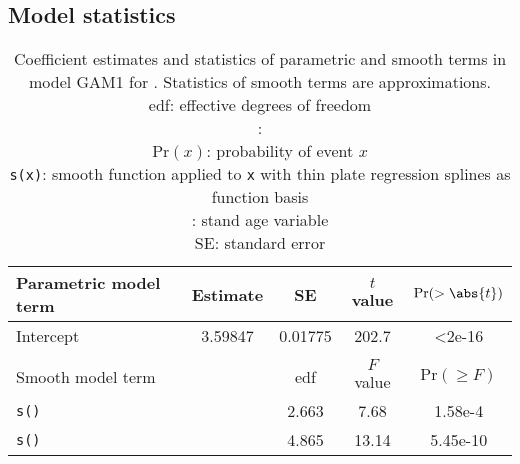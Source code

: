 \subsection{Model statistics}
\begin{singlespace}
  \begin{table}[h]
    \caption{Coefficient estimates and statistics of parametric and smooth terms in model GAM1 for \Beech{}.  Statistics of smooth terms are approximations. \\
      edf: effective degrees of freedom \\
      \texttt{\ProductivityIndexVariableR{}}: \ProductivityIndexVariableText{} \\
      \(\text{Pr}(x)\): probability of event \(x\) \\
      \texttt{s(x)}: smooth function applied to \texttt{x} with thin plate regression splines as function basis \\
      \texttt{\StandAgeVariableR{}}: stand age variable \\
      SE: standard error}
    \label{tab:StatisticsGAM1Beech}
    {\tabulinesep=2mm
      \begin{tabu}{L
          S[table-format = 1.5]
          S[table-format = 1.5]
          S[table-format = 3.2]
          S[table-format = 1.2e-2, table-comparator = true]
        }
        \toprule
        Parametric model term & {Estimate} & {SE} & {\(t\) value} & {\(\text{Pr}(> \abs{t})\)} \\
        \midrule
        Intercept & 3.59847 & 0.01775 & 202.7 & <2e-16 \\
        \\
        Smooth model term &  & {edf} & {\(F\) value} & {\(\text{Pr}(\geq F)\)} \\
        \midrule
        \texttt{s(\StandAgeVariableR{})} & & 2.663 & 7.68 & 1.58e-4 \\
        \texttt{s(\ProductivityIndexVariableR{})} & & 4.865 & 13.14 & 5.45e-10 \\
        \bottomrule
      \end{tabu}
    }
  \end{table}
\end{singlespace}

